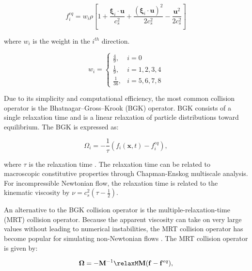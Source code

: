 \documentclass{article}
\newcommand{\pos}{\mathbf{x}}
\newcommand{\pvel}{\boldsymbol{\xi}}
\newcommand{\mvel}{\mathbf{u}}
\newcommand{\cop}{\boldsymbol{\Omega}}
\newcommand{\transM}{\mathbf{M}}
\begin{document}
\begin{equation}
f_i^{eq} = w_i \rho \left[1 + \frac{\pvel_i \cdot \mvel}{c_s^2} + \frac{(\pvel_i \cdot \mvel)^2}{2c_s^2} - \frac{\mvel^2}{2c_s^2} \right]
\end{equation}

\noindent where $w_i$ is the weight in the $i^{th}$ direction.

\begin{equation*}
w_i = \begin{cases}
    \frac{4}{9}, & i = 0 \\
    \frac{1}{9}, & i = 1, 2, 3, 4 \\
    \frac{1}{36}, & i = 5, 6, 7, 8
\end{cases}
\end{equation*}

Due to its simplicity and computational efficiency, the most common collision operator is the Bhatnagar--Gross--Krook (BGK) operator.
BGK consists of a single relaxation time and is a linear relaxation of particle distributions toward equilibrium.
The BGK is expressed as:

\begin{equation}
\Omega_i = -\frac{1}{\tau} (f_i(\pos, t) - f_i^{eq}),
\end{equation}

\noindent where $\tau$ is the relaxation time \cite{Bha54}.
The relaxation time can be related to macroscopic constitutive properties through Chapman-Enskog multiscale analysis.
For incompressible Newtonian flow, the relaxation time is related to the kinematic viscosity by $\nu = c_s^2(\tau - \frac{1}{2})$.

An alternative to the BGK collision operator is the multiple-relaxation-time (MRT) collision operator.
Because the apparent viscosity can take on very large values without leading to numerical instabilities, the MRT collision operator has become popular for simulating non-Newtonian flows \cite{chen2014simulations,fallah2012multiple,tang2011bingham,vikhansky2008lattice,chai2011multiple}. %
The MRT collision operator is given by:

\begin{equation} \label{eq:mrt-col-op}
	\cop = - {\transM}^{-1} \relaxM \transM (\mathbf{f} - \mathbf{f}^{eq}),
\end{equation}
\end{document}
